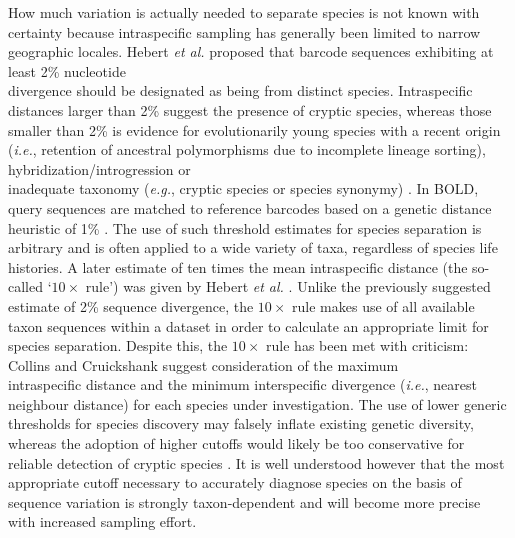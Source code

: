 How much variation is actually needed to separate species is not known with certainty because intraspecific sampling has generally been limited to narrow geographic locales. Hebert \textit{et al.} \cite{hebert2003biological} proposed that barcode sequences exhibiting at least 2\% nucleotide \\ divergence should be designated as being from distinct species. Intraspecific distances larger than 2\% suggest the presence of cryptic species, whereas those smaller than 2\% is evidence for evolutionarily young species with a recent origin (\textit{i.e.}, retention of ancestral polymorphisms due to incomplete lineage sorting), hybridization/introgression or \\ inadequate taxonomy (\textit{e.g.}, cryptic species or species synonymy) \cite{hubert2015dna}. In BOLD, query sequences are matched to reference barcodes based on a genetic distance heuristic of 1\% \cite{ratnasingham2007bold}. The use of such threshold estimates for species separation is arbitrary and is often applied to a wide variety of taxa, regardless of species life histories. A later estimate of ten times the mean intraspecific distance (the so-called `$10\times$ rule') was given by Hebert \textit{et al.} \cite{hebert2004identification}. Unlike the previously suggested estimate of 2\% sequence divergence, the $10\times$ rule makes use of all available taxon sequences within a dataset in order to calculate an appropriate limit for species separation. Despite this, the $10\times$ rule has been met with criticism: Collins and Cruickshank \cite{collins2013seven} suggest consideration of the maximum \\ intraspecific distance and the minimum interspecific divergence (\textit{i.e.}, nearest neighbour distance) for each species under investigation. The use of lower generic thresholds for species discovery may falsely inflate existing genetic diversity, whereas the adoption of higher cutoffs would likely be too conservative for reliable detection of cryptic species \cite{april2011genetic}. It is well understood however that the most appropriate cutoff necessary to accurately diagnose species on the basis of sequence variation is strongly taxon-dependent \cite{hebert2003barcoding, hickerson2006dna, meyer2005dna} and will become more precise with increased sampling effort.



